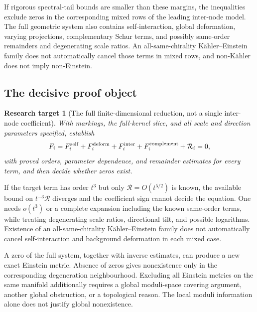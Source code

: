 \documentclass[a4paper,11pt]{article}
\numberwithin{equation}{section}
\newtheorem{target}[theorem]{Research target}
\theoremstyle{definition}
\begin{document}
If rigorous spectral-tail bounds are smaller than these margins, the inequalities exclude zeros in the corresponding mixed rows of the leading inter-node model. The full geometric system also contains self-interaction, global deformation, varying projections, complementary Schur terms, and possibly same-order remainders and degenerating scale ratios. An all-same-chirality K\"ahler--Einstein family does not automatically cancel those terms in mixed rows, and non-K\"ahler does not imply non-Einstein.

\subsection{The decisive proof object}
\begin{target}[The full finite-dimensional reduction, not a single inter-node coefficient]
With markings, the full-kernel slice, and all scale and direction parameters specified, establish
\begin{equation}\label{eq:LS}
F_i=F_i^{\rm self}+F_i^{\rm deform}+F_i^{\rm inter}
+F_i^{\rm complement}+\mathcal R_i=0,
\end{equation}
with proved orders, parameter dependence, and remainder estimates for every term, and then decide whether zeros exist.
\end{target}
If the target term has order $t^3$ but only $\mathcal R=O(t^{5/2})$ is known, the available bound on $t^{-3}\mathcal R$ diverges and the coefficient sign cannot decide the equation. One needs $o(t^3)$ or a complete expansion including the known same-order terms, while treating degenerating scale ratios, directional tilt, and possible logarithms. Existence of an all-same-chirality K\"ahler--Einstein family does not automatically cancel self-interaction and background deformation in each mixed case.

A zero of the full system, together with inverse estimates, can produce a new exact Einstein metric. Absence of zeros gives nonexistence only in the corresponding degeneration neighbourhood. Excluding all Einstein metrics on the same manifold additionally requires a global moduli-space covering argument, another global obstruction, or a topological reason. The local moduli information alone does not justify global nonexistence.
\end{document}
